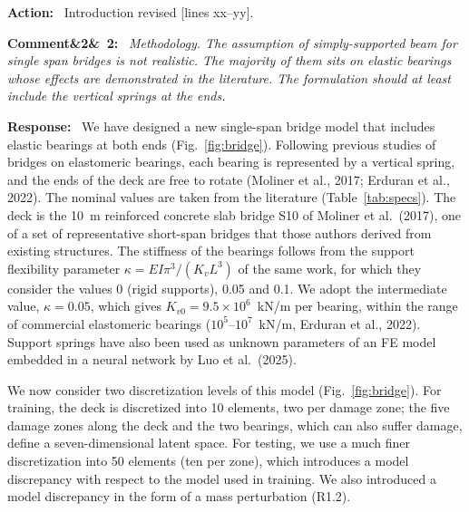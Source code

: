 \documentclass[11pt]{article}
\newenvironment{rcomment}[1]{\par\bigskip\noindent\textbf{Comment\ifx&#1&\else\ #1\fi:}\ \itshape}{\par}
\newenvironment{response}{\par\smallskip\noindent\color{resp}\textbf{Response:}\ }{\par}
\newenvironment{action}{\par\smallskip\noindent\color{resp}\textbf{Action:}\ }{\par}
\newcommand{\tbd}[1]{\textcolor{note}{\textsf{[#1]}}}
\newcommand{\lines}[1]{\tbd{lines #1}}
\begin{document}
\begin{action}
Introduction revised \lines{xx--yy}.
\end{action}

\begin{rcomment}{2}
Methodology. The assumption of simply-supported beam for single span bridges is not realistic. 
The majority of them sits on elastic bearings whose effects are demonstrated in the literature. 
The formulation should at least include the vertical springs at the ends.
\end{rcomment}

\begin{response}
We have designed a new single-span bridge model that includes elastic bearings at both ends (Fig.~\ref{fig:bridge}).
Following previous studies of bridges on elastomeric bearings, each bearing is represented by a vertical spring, and the
ends of the deck are free to rotate (Moliner et al., 2017; Erduran et al., 2022). The nominal values are taken from the
literature (Table~\ref{tab:specs}). The deck is the 10~m reinforced concrete slab bridge S10 of Moliner et al.\ (2017),
one of a set of representative short-span bridges that those authors derived from existing structures. The stiffness of
the bearings follows from the support flexibility parameter $\kappa=EI\pi^3/(K_vL^3)$ of the same work, for which they
consider the values 0 (rigid supports), 0.05 and 0.1. We adopt the intermediate value, $\kappa=0.05$, which gives
$K_{v0}=9.5\times10^{6}$~kN/m per bearing, within the range of commercial elastomeric bearings ($10^{5}$--$10^{7}$~kN/m,
Erduran et al., 2022). Support springs have also been used as unknown parameters of an FE model embedded in a neural
network by Luo et al.\ (2025).

We now consider two discretization levels of this model (Fig.~\ref{fig:bridge}). For training, the deck is discretized
into 10 elements, two per damage zone; the five damage zones along the deck and the two bearings, which can also suffer
damage, define a seven-dimensional latent space. For testing, we use a much finer discretization into 50 elements (ten per
zone), which introduces a model discrepancy with respect to the model used in training. We also introduced a model
discrepancy in the form of a mass perturbation (R1.2).
\end{response}
\end{document}
